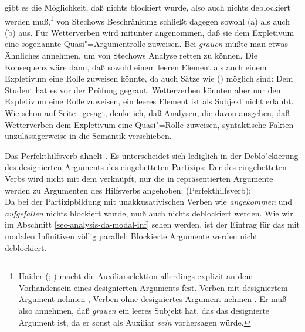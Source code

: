 gibt es die Möglichkeit, daß nichts blockiert wurde, also auch nichts deblockiert werden muß,\footnote{
        Haider (\citeyear[]{Haider84a}; \citeyear[]{Haider86}) macht die Auxiliarselektion allerdings explizit
        an dem Vorhandensein eines designierten Arguments fest. Verben mit designiertem
        Argument nehmen \haben, Verben ohne designiertes Argument nehmen \sein. Er muß
        also annehmen, daß \emph{grauen} ein leeres Subjekt hat, das das designierte
        Argument ist, da er sonst als Auxiliar \emph{sein} vorhersagen würde.%
}
von Stechows Beschränkung schließt dagegen sowohl (a) als auch (b) aus.
Für Wetterverben wird mitunter angenommen, daß sie dem Expletivum eine sogenannte
Quasi"=Argumentrolle zuweisen. Bei \emph{grauen} müßte man
etwas Ähnliches annehmen, um von Stechows Analyse retten zu können. Die Konsequenz wäre dann, daß \grauen
sowohl einem leeren Element als auch einem Expletivum eine Rolle zuweisen könnte,
da auch Sätze wie () möglich sind:
\ea
Dem Student hat es vor der Prüfung gegraut.
\z
Wetterverben könnten aber nur dem Expletivum eine Rolle zuweisen, ein leeres
Element ist als Subjekt nicht erlaubt. Wie schon auf Seite~\pageref{page-syntaktisierung} gesagt,
denke ich, daß Analysen, die davon ausgehen, daß Wetterverben dem Expletivum eine Quasi"=Rolle
zuweisen, syntaktische Fakten unzulässigerweise in die Semantik verschieben. 

Das Perfekthilfsverb \sein ähnelt \haben. Es unterscheidet sich lediglich 
in der Deblo"ckierung des designierten Arguments des eingebetteten Partizips: Der \subjw
des eingebetteten Verbs wird nicht mit dem \subcatw verknüpft, nur die in \subcat repräsentierten
Argumente  werden zu Argumenten des Hilfsverbs angehoben:
\eas
\mbox{\sein (Perfekthilfsverb):}\\
\label{le-sein-perfekt}
\zs
Da bei der Partizipbildung mit unakkusativischen Verben wie \emph{angekommen} und \emph{aufgefallen}
nichts blockiert wurde, muß auch nichts deblockiert werden. Wie wir im
Abschnitt \ref{sec-analysis-da-modal-inf} sehen werden, ist der Eintrag für das \sein mit modalen
Infinitiven völlig parallel: Blockierte Argumente werden nicht deblockiert.


